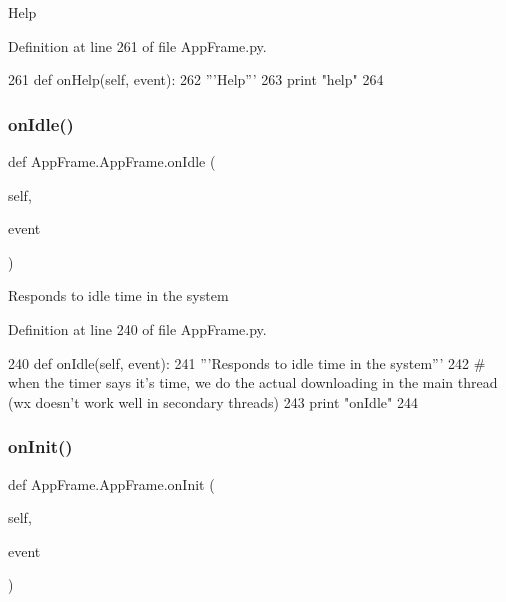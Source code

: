 \begin{DoxyVerb}Help\end{DoxyVerb}
 

Definition at line 261 of file App\+Frame.\+py.


\begin{DoxyCode}
261     \textcolor{keyword}{def }onHelp(self, event):
262         \textcolor{stringliteral}{'''Help'''}
263         \textcolor{keywordflow}{print} \textcolor{stringliteral}{"help"}
264         
\end{DoxyCode}
\mbox{\label{classAppFrame_1_1AppFrame_aeaebe92cb0672c1b2f03625d3fbc0c5d}} 
\subsubsection{\texorpdfstring{on\+Idle()}{onIdle()}}
{\footnotesize\ttfamily def App\+Frame.\+App\+Frame.\+on\+Idle (\begin{DoxyParamCaption}\item[{}]{self,  }\item[{}]{event }\end{DoxyParamCaption})}

\begin{DoxyVerb}Responds to idle time in the system\end{DoxyVerb}
 

Definition at line 240 of file App\+Frame.\+py.


\begin{DoxyCode}
240     \textcolor{keyword}{def }onIdle(self, event):
241         \textcolor{stringliteral}{'''Responds to idle time in the system'''}
242         \textcolor{comment}{# when the timer says it's time, we do the actual downloading in the main thread (wx doesn't work
       well in secondary threads)}
243         \textcolor{keywordflow}{print} \textcolor{stringliteral}{"onIdle"}
244         
\end{DoxyCode}
\mbox{\label{classAppFrame_1_1AppFrame_a3b9d3eb6615829d42754d51b4d82f300}} 
\subsubsection{\texorpdfstring{on\+Init()}{onInit()}}
{\footnotesize\ttfamily def App\+Frame.\+App\+Frame.\+on\+Init (\begin{DoxyParamCaption}\item[{}]{self,  }\item[{}]{event }\end{DoxyParamCaption})}



